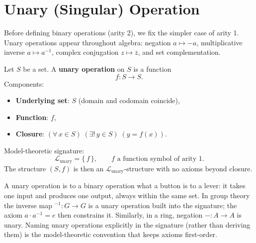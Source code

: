 \medskip

\section*{Unary (Singular) Operation}

\noindent
Before defining binary operations (arity 2), we fix the simpler case of
arity 1.  Unary operations appear throughout algebra: negation $a \mapsto -a$,
multiplicative inverse $a \mapsto a^{-1}$, complex conjugation
$z \mapsto \bar{z}$, and set complementation.

\begin{definition}
  Let $S$ be a set. A \textbf{unary operation} on $S$ is a function
  \[
    f : S \to S.
  \]
  Components:
  \begin{itemize}
    \item \textbf{Underlying set}: $S$ (domain and codomain coincide),
    \item \textbf{Function}: $f$,
    \item \textbf{Closure}: $(\forall\, x \in S)\;(\exists!\, y \in S)\;(y = f(x))$.
  \end{itemize}
  Model-theoretic signature:
  \[
    \mathcal{L}_{\mathrm{unary}} = \{\,f\,\},
    \qquad f \text{ a function symbol of arity } 1.
  \]
  The structure $(S, f)$ is then an $\mathcal{L}_{\mathrm{unary}}$-structure
  with no axioms beyond closure.
\end{definition}

\begin{remark}
  A unary operation is to a binary operation what a button is to a lever:
  it takes one input and produces one output, always within the same set.
  In group theory the inverse map ${}^{-1} : G \to G$ is a unary operation
  built into the signature; the axiom $a \cdot a^{-1} = e$ then constrains
  it.  Similarly, in a ring, negation $- : A \to A$ is unary.  Naming
  unary operations explicitly in the signature (rather than deriving them)
  is the model-theoretic convention that keeps axioms first-order.
\end{remark}

\clearpage


\clearpage\thispagestyle{plain}

